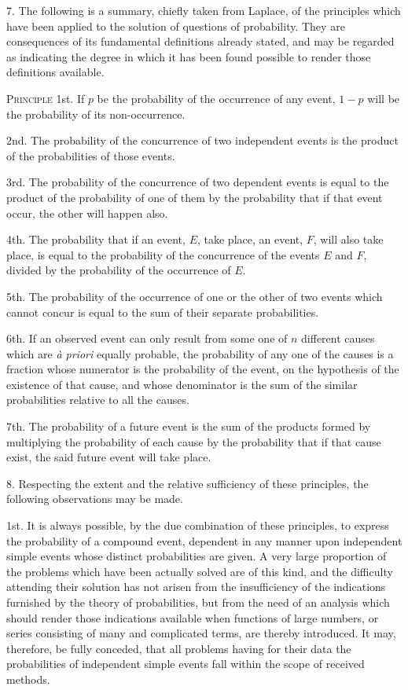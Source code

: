 \documentclass[oneside]{book}
\begin{document}
7. The following is a summary, chiefly taken from Laplace, of
the principles which have been applied to the solution of questions
of probability. They are consequences of its fundamental
definitions already stated, and may be regarded as indicating the degree
in which it has been found possible to render those definitions
available.

\textsc{Principle} 1st. If $p$ be the probability of the occurrence of
any event, $1-p$ will be the probability of its non-occurrence.

2nd. The probability of the concurrence of two independent
events is the product of the probabilities of those events.

3rd. The probability of the concurrence of two dependent
events is equal to the product of the probability of one of them
by the probability that if that event occur, the other will happen
also.

4th. The probability that if an event, $E$, take place, an event,
$F$, will also take place, is equal to the probability of the concurrence of the events $E$ and $F$, divided by the probability of the
occurrence of $E$.

5th. The probability of the occurrence of one or the other of
two events which cannot concur is equal to the sum of their separate
probabilities.

6th. If an observed event can only result from some one of $n$
different causes which are \textit{\`{a} priori} equally probable, the probability
of any one of the causes is a fraction whose numerator is the
probability of the event, on the hypothesis of the existence of that
cause, and whose denominator is the sum of the similar probabilities
relative to all the causes.

7th. The probability of a future event is the sum of the products
formed by multiplying the probability of each cause by
the probability that if that cause exist, the said future event
will take place.

8. Respecting the extent and the relative sufficiency of these
principles, the following observations may be made.

1st. It is always possible, by the due combination of these
principles, to express the probability of a compound event, dependent
in any manner upon independent simple events whose
distinct probabilities are given. A very large proportion of the
problems which have been actually solved are of this kind, and
the difficulty attending their solution has not arisen from the insufficiency
of the indications furnished by the theory of probabilities,
but from the need of an analysis which should render
those indications available when functions of large numbers, or
series consisting of many and complicated terms, are thereby introduced.
It may, therefore, be fully conceded, that all problems
having for their data the probabilities of independent
simple events fall within the scope of received methods.
\end{document}
